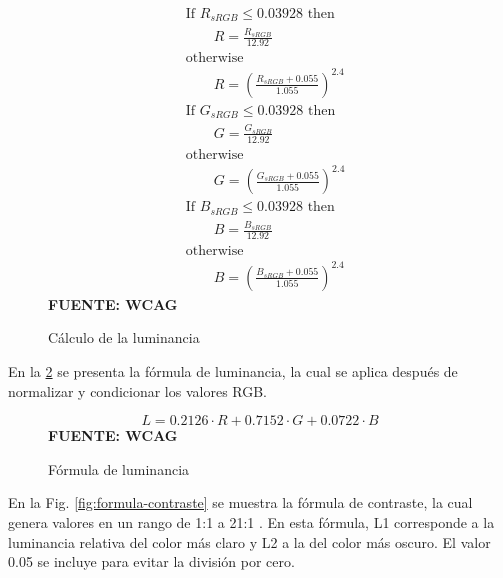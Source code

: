 \documentclass[lettersize,journal]{IEEEtran}
\begin{document}
\begin{itemize}
		\begin{figure}[ht]
			\centering
			\caption{Cálculo de la luminancia}
			\label{fig:calculo-luminancia}
			\footnotesize %
			\setlength{\abovedisplayskip}{2pt} %
			\setlength{\belowdisplayskip}{2pt} %
			\[
			\begin{aligned}
				&\text{If } R_{sRGB} \leq 0.03928 \text{ then} \\
				&\qquad R = \frac{R_{sRGB}}{12.92} \\
				&\text{otherwise} \\
				&\qquad R = \left( \frac{R_{sRGB} + 0.055}{1.055} \right)^{2.4} \\
				&\text{If } G_{sRGB} \leq 0.03928 \text{ then} \\
				&\qquad G = \frac{G_{sRGB}}{12.92} \\
				&\text{otherwise} \\
				&\qquad G = \left( \frac{G_{sRGB} + 0.055}{1.055} \right)^{2.4} \\
				&\text{If } B_{sRGB} \leq 0.03928 \text{ then} \\
				&\qquad B = \frac{B_{sRGB}}{12.92} \\
				&\text{otherwise} \\
				&\qquad B = \left( \frac{B_{sRGB} + 0.055}{1.055} \right)^{2.4}
			\end{aligned}
			\]
			\vspace{0.1cm}
			\scriptsize\textbf{FUENTE: WCAG \cite{W3CLuminance2021}} %
		\end{figure}
		
		\noindent En la \ref{fig:formula-luminancia} se presenta la fórmula de luminancia, la cual se aplica después de normalizar y condicionar los valores RGB.
		
		\begin{figure}[ht]
			\centering
			\caption{Fórmula de luminancia}
			\label{fig:formula-luminancia}
			\begin{equation*}
				L = 0.2126 \cdot R + 0.7152 \cdot G + 0.0722 \cdot B
			\end{equation*}
			\small\textbf{FUENTE: WCAG \cite{W3CLuminance2021}}
		\end{figure}
		
		\noindent En la Fig. \ref{fig:formula-contraste} se muestra la fórmula de contraste, la cual genera valores en un rango de 1:1 a 21:1 \cite{W3CContrast2012}. En esta fórmula, L1 corresponde a la luminancia relativa del color más claro y L2 a la del color más oscuro. El valor 0.05 se incluye para evitar la división por cero.
		

\end{itemize}
\end{document}
